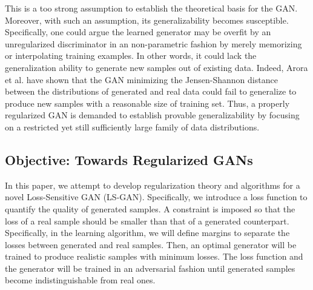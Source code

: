 This is a too strong assumption to establish the theoretical basis for the GAN. Moreover, with such an assumption, its generalizability becomes susceptible.
Specifically, one could argue the learned generator may be overfit by an unregularized discriminator in an non-parametric fashion by merely memorizing or interpolating training examples. In other words, it could lack the generalization ability to generate new samples out of existing data. %
Indeed, Arora et al. \cite{arora2017generalization} have shown that the GAN minimizing the Jensen-Shannon distance between the distributions of generated and real data could fail to generalize to produce new samples with a reasonable size of training set.
Thus, a properly regularized GAN is demanded to establish provable generalizability by focusing on a restricted yet still sufficiently large family of data distributions.

\subsection{Objective: Towards Regularized GANs}
In this paper, we attempt to develop regularization theory and algorithms for a novel Loss-Sensitive GAN (LS-GAN).
Specifically, we introduce a loss function to quantify the quality of generated samples. A constraint is imposed so that the loss of a real sample should be smaller than that of a generated counterpart. Specifically, in the learning algorithm, we will define margins to separate the losses between generated and real samples. Then, an optimal generator will be trained to produce realistic samples with minimum losses. The loss function and the generator will be trained in an adversarial fashion until generated samples become indistinguishable from real ones.

